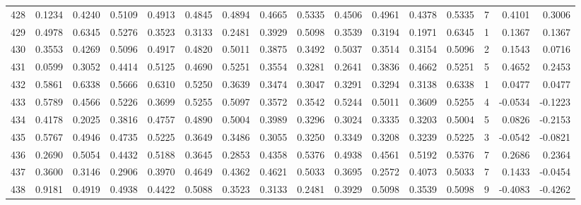 \begin{tabular}{lrrrrrrrrrrrrrrr}
428 &      0.1234 &  0.4240 &  0.5109 &  0.4913 &  0.4845 &  0.4894 &  0.4665 &  0.5335 &  0.4506 &  0.4961 &   0.4378 &     0.5335 &      7 &                    0.4101 &                     0.3006 \\
429 &      0.4978 &  0.6345 &  0.5276 &  0.3523 &  0.3133 &  0.2481 &  0.3929 &  0.5098 &  0.3539 &  0.3194 &   0.1971 &     0.6345 &      1 &                    0.1367 &                     0.1367 \\
430 &      0.3553 &  0.4269 &  0.5096 &  0.4917 &  0.4820 &  0.5011 &  0.3875 &  0.3492 &  0.5037 &  0.3514 &   0.3154 &     0.5096 &      2 &                    0.1543 &                     0.0716 \\
431 &      0.0599 &  0.3052 &  0.4414 &  0.5125 &  0.4690 &  0.5251 &  0.3554 &  0.3281 &  0.2641 &  0.3836 &   0.4662 &     0.5251 &      5 &                    0.4652 &                     0.2453 \\
432 &      0.5861 &  0.6338 &  0.5666 &  0.6310 &  0.5250 &  0.3639 &  0.3474 &  0.3047 &  0.3291 &  0.3294 &   0.3138 &     0.6338 &      1 &                    0.0477 &                     0.0477 \\
433 &      0.5789 &  0.4566 &  0.5226 &  0.3699 &  0.5255 &  0.5097 &  0.3572 &  0.3542 &  0.5244 &  0.5011 &   0.3609 &     0.5255 &      4 &                   -0.0534 &                    -0.1223 \\
434 &      0.4178 &  0.2025 &  0.3816 &  0.4757 &  0.4890 &  0.5004 &  0.3989 &  0.3296 &  0.3024 &  0.3335 &   0.3203 &     0.5004 &      5 &                    0.0826 &                    -0.2153 \\
435 &      0.5767 &  0.4946 &  0.4735 &  0.5225 &  0.3649 &  0.3486 &  0.3055 &  0.3250 &  0.3349 &  0.3208 &   0.3239 &     0.5225 &      3 &                   -0.0542 &                    -0.0821 \\
436 &      0.2690 &  0.5054 &  0.4432 &  0.5188 &  0.3645 &  0.2853 &  0.4358 &  0.5376 &  0.4938 &  0.4561 &   0.5192 &     0.5376 &      7 &                    0.2686 &                     0.2364 \\
437 &      0.3600 &  0.3146 &  0.2906 &  0.3970 &  0.4649 &  0.4362 &  0.4621 &  0.5033 &  0.3695 &  0.2572 &   0.4073 &     0.5033 &      7 &                    0.1433 &                    -0.0454 \\
438 &      0.9181 &  0.4919 &  0.4938 &  0.4422 &  0.5088 &  0.3523 &  0.3133 &  0.2481 &  0.3929 &  0.5098 &   0.3539 &     0.5098 &      9 &                   -0.4083 &                    -0.4262 \\

\end{tabular}

